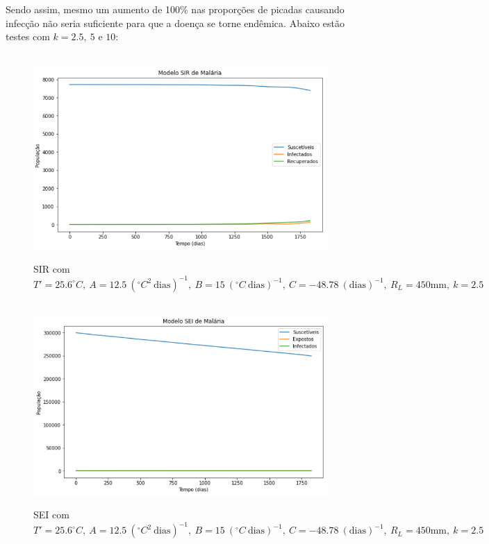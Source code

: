 \\\\
Sendo assim, mesmo um aumento de 100\% nas proporções de picadas causando infecção
não seria suficiente para que a doença se torne endêmica. Abaixo estão testes com $k=2.5, \ 5$ e $10$:
\begin{figure}[!ht]
        \centering
        \hbox{\hspace{2.0em} \includegraphics[scale=0.7] {Correcao_SIR_Desmat_k=2_5.png}}
        \caption{SIR com $T'=25.6 ^\circ C, \ A=12.5 \ (^\circ C^2 \ \text{dias})^{-1}, \ B=15 \ (^\circ C \ \text{dias})^{-1}, \ C=-48.78 \ (\text{dias})^{-1}, \ R_L=450 \text{mm}, \ k=2.5$}
\end{figure} 
\begin{figure}[!ht]
        \centering
        \hbox{\hspace{1.5em} \includegraphics[scale=0.7] {Correcao_SEI_Desmat_k=2_5.png}}
        \caption{SEI com $T'=25.6 ^\circ C, \ A=12.5 \ (^\circ C^2 \ \text{dias})^{-1}, \ B=15 \ (^\circ C \ \text{dias})^{-1}, \ C=-48.78 \ (\text{dias})^{-1}, \ R_L=450 \text{mm}, \ k=2.5$}
\end{figure} 
